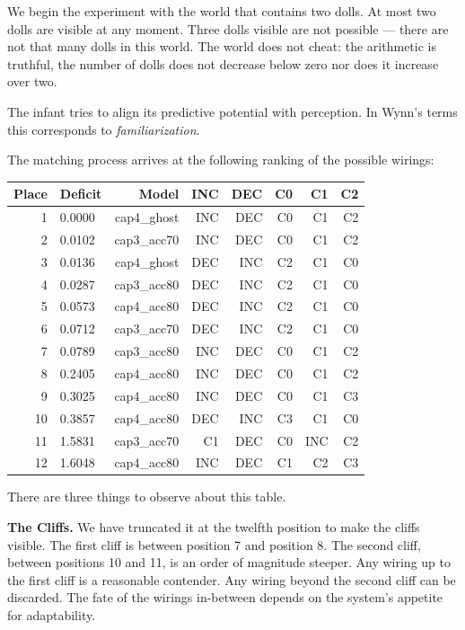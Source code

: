 \documentclass[12pt, a4paper]{article}
\begin{document}
We begin the experiment with the world that contains two dolls. At most two
dolls are visible at any moment. Three dolls visible are not possible --- there
are not that many dolls in this world. The world does not cheat: the arithmetic
is truthful, the number of dolls does not decrease below zero nor does it
increase over two.

The infant tries to align its predictive potential with perception. In Wynn's
terms this corresponds to \textit{familiarization}.

The matching process arrives at the following ranking of the possible wirings:

\begin{center}
\begin{tabular}{rlrrrrrr}
\toprule
Place & Deficit & Model & INC & DEC & C0 & C1 & C2 \\
\midrule
1  & 0.0000 & cap4\_ghost  & INC & DEC & C0 & C1 & C2 \\
2  & 0.0102 & cap3\_acc70  & INC & DEC & C0 & C1 & C2 \\
3  & 0.0136 & cap4\_ghost  & DEC & INC & C2 & C1 & C0 \\
4  & 0.0287 & cap3\_acc80  & DEC & INC & C2 & C1 & C0 \\
5  & 0.0573 & cap4\_acc80  & DEC & INC & C2 & C1 & C0 \\
6  & 0.0712 & cap3\_acc70  & DEC & INC & C2 & C1 & C0 \\
7  & 0.0789 & cap3\_acc80  & INC & DEC & C0 & C1 & C2 \\
8  & 0.2405 & cap4\_acc80  & INC & DEC & C0 & C1 & C2 \\
9  & 0.3025 & cap4\_acc80  & INC & DEC & C0 & C1 & C3 \\
10 & 0.3857 & cap4\_acc80  & DEC & INC & C3 & C1 & C0 \\
11 & 1.5831 & cap3\_acc70  & C1  & DEC & C0 & INC & C2 \\
12 & 1.6048 & cap4\_acc80  & INC & DEC & C1 & C2 & C3 \\
\bottomrule
\end{tabular}
\end{center}

There are three things to observe about this table.

\textbf{The Cliffs.} We have truncated it at the twelfth position to make the
cliffs visible. The first cliff is between position 7 and position 8. The
second cliff, between positions 10 and 11, is an order of magnitude steeper.
Any wiring up to the first cliff is a reasonable contender. Any wiring beyond
the second cliff can be discarded. The fate of the wirings in-between depends
on the system's appetite for adaptability.
\end{document}
